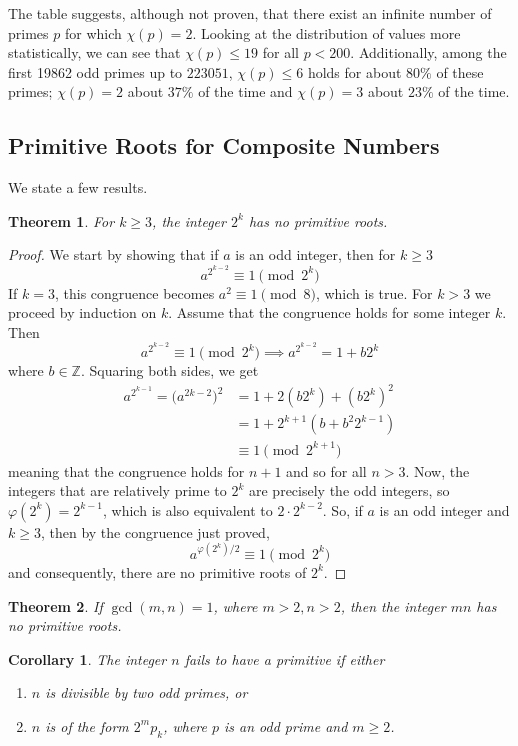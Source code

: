 \documentclass{article}
\newtheorem{theorem}{Theorem}[section]
\newtheorem{corollary}{Corollary}[theorem]
\theoremstyle{remark}
\theoremstyle{definition}
\begin{document}
The table suggests, although not proven, that there exist an infinite number of primes $p$ for which $\chi(p) = 2$. Looking at the distribution of values more statistically, we can see that $\chi(p) \leq 19$ for all $p < 200$. Additionally, among the first 19862 odd primes up to $223051$, $\chi(p) \leq 6$ holds for about $80\%$ of these primes; $\chi(p) = 2$ about $37\%$ of the time and $\chi(p) = 3$ about $23\%$ of the time. 

\subsection{Primitive Roots for Composite Numbers}
We state a few results. 

\begin{theorem}
For $k\geq 3$, the integer $2^k$ has no primitive roots. 
\end{theorem}
\begin{proof}
We start by showing that if $a$ is an odd integer, then for $k\geq 3$ 
\[a^{2^{k-2}} \equiv 1 \pmod{2^k}\]
If $k=3$, this congruence becomes $a^2 \equiv 1 \pmod{8}$, which is true. For $k > 3$ we proceed by induction on $k$. Assume that the congruence holds for some integer $k$. Then 
\[a^{2^{k-2}} \equiv 1 \pmod{2^k} \implies a^{2^{k-2}} = 1 + b 2^k\]
where $b \in \mathbb{Z}$. Squaring both sides, we get
\begin{align*}
    a^{2^{k-1}} = \big(a^{2k-2}\big)^2 & = 1 + 2(b 2^k) + (b2^k)^2 \\
    & = 1 + 2^{k+1} (b + b^2 2^{k-1}) \\
    & \equiv 1 \pmod{2^{k+1}}
\end{align*}
meaning that the congruence holds for $n+1$ and so for all $n>3$. Now, the integers that are relatively prime to $2^k$ are precisely the odd integers, so $\varphi(2^k) = 2^{k-1}$, which is also equivalent to $2 \cdot 2^{k-2}$. So, if $a$ is an odd integer and $k\geq 3$, then by the congruence just proved, 
\[a^{\varphi(2^k)/2} \equiv 1 \pmod{2^k}\]
and consequently, there are no primitive roots of $2^k$. 
\end{proof}

\begin{theorem}
If $\gcd(m, n) = 1$, where $m>2, n>2$, then the integer $mn$ has no primitive roots. 
\end{theorem}

\begin{corollary}
The integer $n$ fails to have a primitive if either
\begin{enumerate}
    \item $n$ is divisible by two odd primes, or
    \item $n$ is of the form $2^m p_k$, where $p$ is an odd prime and $m\geq 2$. 
\end{enumerate}
\end{corollary}
\end{document}
